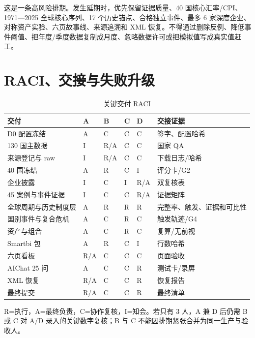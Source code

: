 \documentclass[UTF8,fontset=windows,12pt,openany]{ctexbook}
\begin{document}
这是一条高风险排期。发生延期时，优先保留证据质量、40 国核心汇率/CPI、1971—2025 全球核心序列、17 个历史锚点、合格独立事件、最多 6 家深度企业、对称资产实验、六页故事线、来源追溯和 XML 恢复。不得通过删除反例、降低事件阈值、把年度/季度数据复制成月度、忽略数据许可或把模拟值写成真实值赶工。

\chapter{RACI、交接与失败升级}

\begin{longtable}{p{4.0cm}p{1.5cm}p{1.5cm}p{1.5cm}p{1.5cm}p{3.1cm}}
\caption{关键交付 RACI}\label{tab:raci}\\
\toprule
\textbf{交付} & \textbf{A} & \textbf{B} & \textbf{C} & \textbf{D} & \textbf{交接证据}\\
\midrule
D0 配置冻结 & A & C & C & C & 签字、配置哈希\\
130 国主数据 & I & R/A & C & C & 国家 QA\\
来源登记与 raw & I & R/A & C & C & 下载日志/哈希\\
40 国冻结 & A & R & C & I & 评分卡/G2\\
企业披露 & I & C & I & R/A & 双复核表\\
45 案例与事件证据 & I & C & C & R/A & 证据矩阵\\
全球周期与历史制度层 & A & R & R & R & 完整率、触发、证据和可比性\\
国别事件与复合危机 & A & C & R & C & 触发轨迹/G4\\
资产与组合 & A & C & R & C & 复算/无前视\\
Smartbi 包 & A & R & C & I & 行数哈希\\
六页看板 & R/A & C & C & C & 页面验收\\
AIChat 25 问 & A & C & C & R & 测试卡/录屏\\
XML 恢复 & R/A & C & C & R & 恢复报告\\
最终提交 & R/A & C & C & R & 最终清单\\
\bottomrule
\end{longtable}

R=执行，A=最终负责，C=协作复核，I=知会。若只有 3 人，A 兼 D 后仍需 B 或 C 对 A/D 录入的关键数字复核；B 与 C 不能因排期紧张合并为同一生产与验收人。
\end{document}
